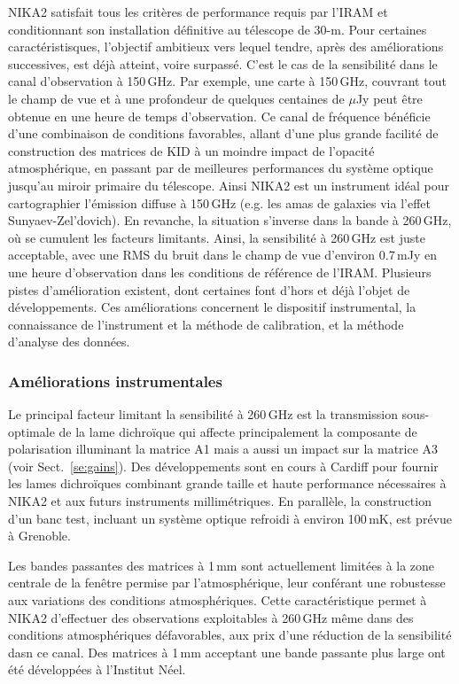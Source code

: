 NIKA2 satisfait tous les critères de performance requis par l'IRAM et
conditionnant son installation définitive au télescope de 30-m. Pour
certaines caractéristisques, l'objectif ambitieux vers lequel tendre,
après des améliorations successives, est déjà atteint, voire
surpassé. C'est le cas de la sensibilité dans le canal d'observation à
150\,GHz. Par exemple, une carte à 150\,GHz, couvrant tout le champ de
vue et à une profondeur de quelques centaines de $\mu$Jy peut être
obtenue en une heure de temps d'observation. Ce canal de fréquence
bénéficie d'une combinaison de conditions favorables, allant d'une plus grande
facilité de construction des matrices de KID à un moindre impact de
l'opacité atmosphérique, en passant par de meilleures performances du
système optique jusqu'au miroir primaire du télescope. Ainsi NIKA2 est
un instrument idéal pour cartographier l'émission diffuse à 150\,GHz
(e.g. les amas de galaxies via l'effet Sunyaev-Zel'dovich). En
revanche, la situation s'inverse dans la bande à 260\,GHz, où se
cumulent les facteurs limitants. Ainsi, la sensibilité à 260\,GHz est
juste acceptable, avec une RMS du bruit dans le champ de vue d'environ
0.7\,mJy en une heure d'observation dans les conditions de référence
de l'IRAM. Plusieurs pistes d'amélioration existent, dont certaines
font d'hors et déjà l'objet de développements. Ces améliorations
concernent le dispositif instrumental, la connaissance de l'instrument
et la méthode de calibration, et la méthode d'analyse des données.

\subsubsection{Améliorations instrumentales}

Le principal facteur limitant la sensibilité à 260\,GHz est la
transmission sous-optimale de la lame dichroïque qui affecte
principalement la composante de polarisation illuminant la matrice A1
mais a aussi un impact sur la matrice A3 (voir
Sect.~\ref{se:gains}). Des développements sont en cours à Cardiff pour
fournir les lames dichroïques combinant grande taille et haute
performance nécessaires à NIKA2 et aux futurs instruments
millimétriques. En parallèle, la construction d'un banc test, incluant
un système optique refroidi à environ 100\,mK, est prévue à Grenoble.

Les bandes passantes des matrices à 1\,mm sont actuellement limitées à
la zone centrale de la fenêtre permise par l'atmosphérique, leur
conférant une robustesse aux variations des conditions atmosphériques.  
Cette caractéristique permet à NIKA2 d'effectuer des observations
exploitables à 260\,GHz même dans des conditions atmosphériques
défavorables, aux prix d'une réduction de la sensibilité dasn ce
canal. Des matrices à 1\,mm acceptant une bande passante plus
large ont été développées à l'Institut Néel. 

